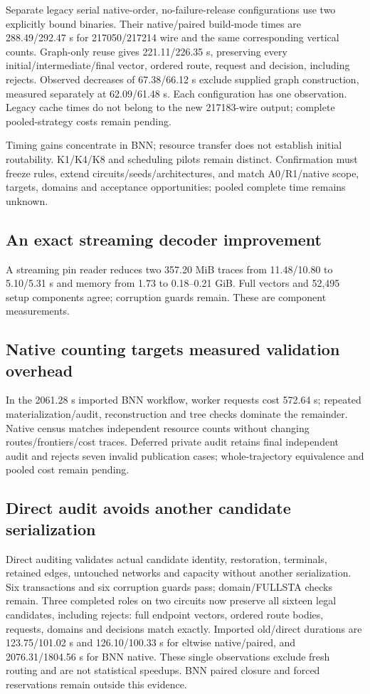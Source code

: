 \documentclass[conference,10pt]{IEEEtran}
\begin{document}
Separate legacy serial native-order, no-failure-release configurations use two explicitly bound binaries. Their native/paired build-mode times are 288.49/292.47 s for 217050/217214 wire and the same corresponding vertical counts. Graph-only reuse gives 221.11/226.35 s, preserving every initial/intermediate/final vector, ordered route, request and decision, including rejects. Observed decreases of 67.38/66.12 s exclude supplied graph construction, measured separately at 62.09/61.48 s. Each configuration has one observation. Legacy cache times do not belong to the new 217183-wire output; complete pooled-strategy costs remain pending.

Timing gains concentrate in BNN; resource transfer does not establish initial routability. K1/K4/K8 and scheduling pilots remain distinct. Confirmation must freeze rules, extend circuits/seeds/architectures, and match A0/R1/native scope, targets, domains and acceptance opportunities; pooled complete time remains unknown.

\subsection{An exact streaming decoder improvement}
A streaming pin reader reduces two 357.20 MiB traces from 11.48/10.80 to 5.10/5.31 s and memory from 1.73 to 0.18--0.21 GiB. Full vectors and 52,495 setup components agree; corruption guards remain. These are component measurements.

\subsection{Native counting targets measured validation overhead}
In the 2061.28 s imported BNN workflow, worker requests cost 572.64 s; repeated materialization/audit, reconstruction and tree checks dominate the remainder. Native census matches independent resource counts without changing routes/frontiers/cost traces. Deferred private audit retains final independent audit and rejects seven invalid publication cases; whole-trajectory equivalence and pooled cost remain pending.

\subsection{Direct audit avoids another candidate serialization}
Direct auditing validates actual candidate identity, restoration, terminals, retained edges, untouched networks and capacity without another serialization. Six transactions and six corruption guards pass; domain/FULLSTA checks remain. Three completed roles on two circuits now preserve all sixteen legal candidates, including rejects: full endpoint vectors, ordered route bodies, requests, domains and decisions match exactly. Imported old/direct durations are 123.75/101.02 s and 126.10/100.33 s for eltwise native/paired, and 2076.31/1804.56 s for BNN native. These single observations exclude fresh routing and are not statistical speedups. BNN paired closure and forced reservations remain outside this evidence.
\end{document}
